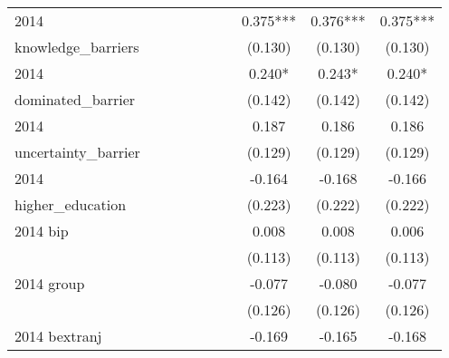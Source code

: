 \begin{table}[htbp]
\begin{tabular}{l*{9}{c}}
2014                &               &               &               &               &               &               &       0.375***&       0.376***&       0.375***\\
knowledge\_barriers  &               &               &               &               &               &               &     (0.130)   &     (0.130)   &     (0.130)   \\
2014                &               &               &               &               &               &               &       0.240*  &       0.243*  &       0.240*  \\
dominated\_barrier   &               &               &               &               &               &               &     (0.142)   &     (0.142)   &     (0.142)   \\
2014                &               &               &               &               &               &               &       0.187   &       0.186   &       0.186   \\
uncertainty\_barrier &               &               &               &               &               &               &     (0.129)   &     (0.129)   &     (0.129)   \\
2014                &               &               &               &               &               &               &      -0.164   &      -0.168   &      -0.166   \\
higher\_education    &               &               &               &               &               &               &     (0.223)   &     (0.222)   &     (0.222)   \\
2014 bip            &               &               &               &               &               &               &       0.008   &       0.008   &       0.006   \\
                    &               &               &               &               &               &               &     (0.113)   &     (0.113)   &     (0.113)   \\
2014 group          &               &               &               &               &               &               &      -0.077   &      -0.080   &      -0.077   \\
                    &               &               &               &               &               &               &     (0.126)   &     (0.126)   &     (0.126)   \\
2014 bextranj       &               &               &               &               &               &               &      -0.169   &      -0.165   &      -0.168   \\

\end{tabular}
\end{table}
